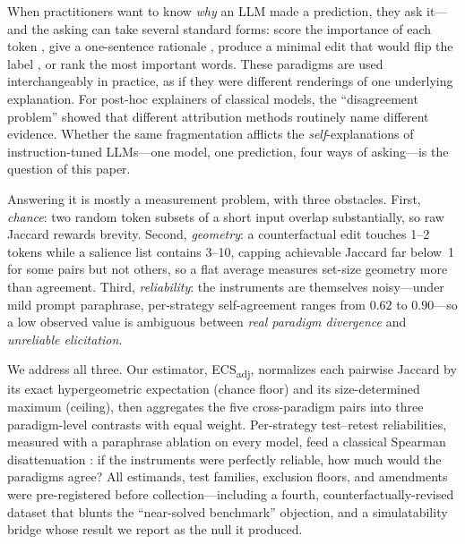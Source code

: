 \documentclass[11pt]{article}
\newcommand{\ecsadj}{\mbox{ECS\textsubscript{adj}}}
\begin{document}
When practitioners want to know \emph{why} an LLM made a prediction, they ask it---and the asking can take several standard forms: score the importance of each token \citep{huang2023can}, give a one-sentence rationale \citep{camburu2018esnli,wiegreffe2021measuring}, produce a minimal edit that would flip the label \citep{ross2021explaining}, or rank the most important words. These paradigms are used interchangeably in practice, as if they were different renderings of one underlying explanation. For post-hoc explainers of classical models, the ``disagreement problem'' \citep{krishna2022disagreement} showed that different attribution methods routinely name different evidence. Whether the same fragmentation afflicts the \emph{self}-explanations of instruction-tuned LLMs---one model, one prediction, four ways of asking---is the question of this paper.

Answering it is mostly a measurement problem, with three obstacles. First, \emph{chance}: two random token subsets of a short input overlap substantially, so raw Jaccard rewards brevity. Second, \emph{geometry}: a counterfactual edit touches 1--2 tokens while a salience list contains 3--10, capping achievable Jaccard far below~1 for some pairs but not others, so a flat average measures set-size geometry more than agreement. Third, \emph{reliability}: the instruments are themselves noisy---under mild prompt paraphrase, per-strategy self-agreement ranges from $0.62$ to $0.90$---so a low observed value is ambiguous between \emph{real paradigm divergence} and \emph{unreliable elicitation}.

We address all three. Our estimator, \ecsadj{}, normalizes each pairwise Jaccard by its exact hypergeometric expectation (chance floor) and its size-determined maximum (ceiling), then aggregates the five cross-paradigm pairs into three paradigm-level contrasts with equal weight. Per-strategy test--retest reliabilities, measured with a paraphrase ablation on every model, feed a classical Spearman disattenuation \citep{spearman1904proof}: if the instruments were perfectly reliable, how much would the paradigms agree? All estimands, test families, exclusion floors, and amendments were pre-registered before collection---including a fourth, counterfactually-revised dataset \citep{kaushik2020learning} that blunts the ``near-solved benchmark'' objection, and a simulatability bridge \citep{chen2024models} whose result we report as the null it produced.
\end{document}
